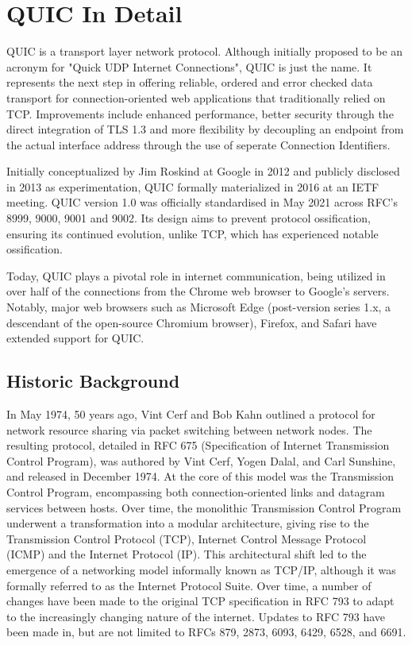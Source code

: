 \chapter{QUIC In Detail}

QUIC is a transport layer network protocol. Although initially proposed to be an acronym for "Quick UDP Internet Connections", QUIC is just the name\cite[10]{rfc9000}. It represents the next step in offering reliable, ordered and error checked data transport for connection-oriented web applications that traditionally relied on TCP. Improvements include enhanced performance, better security through the direct integration of TLS 1.3 and more flexibility by decoupling an endpoint from the actual interface address through the use of seperate Connection Identifiers. 

Initially conceptualized by Jim Roskind at Google in 2012 and publicly disclosed in 2013 as experimentation, QUIC formally materialized in 2016 at an IETF meeting. QUIC version 1.0 was officially standardised in May 2021 across RFC's 8999\cite{rfc8999}, 9000\cite{rfc9000}, 9001\cite{rfc9001} and 9002\cite{rfc9002}. Its design aims to prevent protocol ossification, ensuring its continued evolution, unlike TCP, which has experienced notable ossification.

Today, QUIC plays a pivotal role in internet communication, being utilized in over half of the connections from the Chrome web browser to Google's servers. Notably, major web browsers such as Microsoft Edge (post-version series 1.x, a descendant of the open-source Chromium browser), Firefox, and Safari have extended support for QUIC.

\section{Historic Background}

In May 1974, 50 years ago, Vint Cerf and Bob Kahn outlined a protocol for network resource sharing via packet switching between network nodes. The resulting protocol, detailed in RFC 675 (Specification of Internet Transmission Control Program), was authored by Vint Cerf, Yogen Dalal, and Carl Sunshine, and released in December 1974. At the core of this model was the Transmission Control Program, encompassing both connection-oriented links and datagram services between hosts. Over time, the monolithic Transmission Control Program underwent a transformation into a modular architecture, giving rise to the Transmission Control Protocol (TCP), Internet Control Message Protocol (ICMP) and the Internet Protocol (IP). This architectural shift led to the emergence of a networking model informally known as TCP/IP, although it was formally referred to as the Internet Protocol Suite. Over time, a number of changes have been made to the original TCP specification in RFC 793 to adapt to the increasingly changing nature of the internet. Updates to RFC 793 have been made in, but are not limited to RFCs 879, 2873, 6093, 6429, 6528, and 6691. \\

